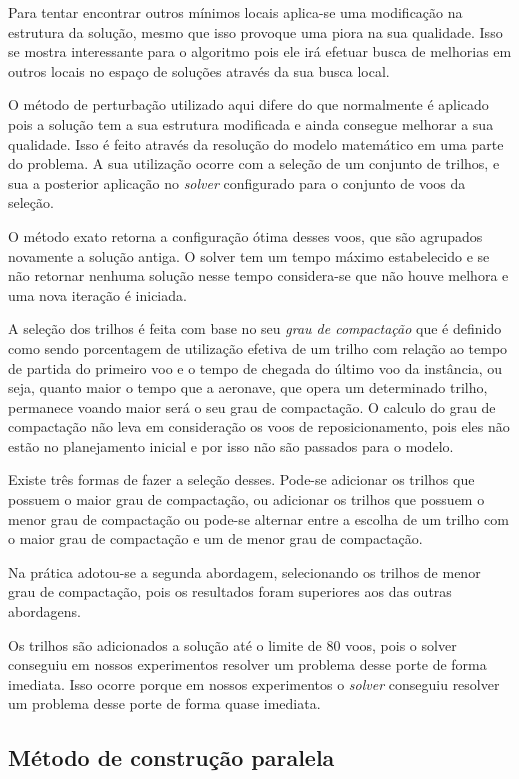 Para tentar encontrar outros mínimos locais aplica-se uma modificação na
estrutura da solução, mesmo que isso provoque uma piora na sua qualidade. Isso
se mostra interessante para o algoritmo pois ele irá efetuar busca de melhorias
em outros locais no espaço de soluções através da sua busca local.
 
O método de perturbação utilizado aqui difere do que normalmente é aplicado
pois a solução tem a sua estrutura modificada e ainda consegue melhorar a sua
qualidade. Isso é feito através da resolução do modelo matemático em uma
parte do problema. A sua utilização ocorre com a seleção de um conjunto de
trilhos, e sua a posterior aplicação no \textit{solver} configurado para o
conjunto de voos da seleção.

O método exato retorna a configuração ótima desses voos, que
são agrupados novamente a solução antiga. O solver tem um tempo máximo
estabelecido e se não retornar nenhuma solução nesse tempo considera-se que não
houve melhora e uma nova iteração é iniciada.

A seleção dos trilhos é feita com base no seu
\textit{grau de compactação} que é definido como sendo porcentagem de
utilização efetiva de um trilho com relação ao tempo de partida do primeiro voo
e o tempo de chegada do último voo da instância, ou seja, quanto maior o tempo
que a aeronave, que opera um determinado trilho, permanece voando maior será o
seu grau de compactação. O calculo do grau de compactação não leva em
consideração os voos de reposicionamento, pois eles não estão no planejamento
inicial e por isso não são passados para o modelo.

Existe três formas de fazer a seleção desses. Pode-se adicionar os trilhos que
possuem o maior grau de compactação, ou adicionar os trilhos que possuem o
menor grau de compactação ou pode-se alternar entre a escolha de um trilho com
o maior grau de compactação e um de menor grau de compactação.

Na prática adotou-se a segunda abordagem, selecionando os trilhos de menor grau
de compactação, pois os resultados foram superiores aos das outras abordagens.
 
Os trilhos são adicionados a solução até o limite de 80 voos, pois o solver
conseguiu em nossos experimentos resolver um problema desse porte de forma
imediata. Isso ocorre porque em nossos experimentos o \textit{solver} conseguiu
resolver um problema desse porte de forma quase imediata.

\subsection{Método de construção paralela}

